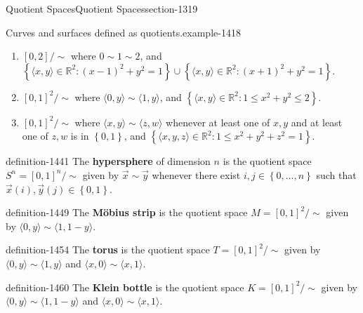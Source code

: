 \documentclass[oneside,10pt,]{article}
\newcommand{\terminology}[1]{\textbf{#1}}
\newcommand{\tuple}[1]{\langle #1 \rangle}
\newcommand{\mb}{\mathbb}
\newcommand{\setBuilder}[2]{\left\{#1:#2\right\}}
\newcommand{\setList}[1]{\left\{#1\right\}}
\begin{document}
\begin{sectionptx}{Quotient Spaces}{}{Quotient Spaces}{}{}{section-1319}
\begin{example}{Curves and surfaces defined as quotients.}{example-1418}
\begin{enumerate}
\item\hypertarget{li-1426}{}\([0,2]/\sim\) where \(0\sim 1\sim 2\), and \(\setBuilder{\tuple{x,y}\in\mb R^2}{(x-1)^2+y^2=1}\cup\setBuilder{\tuple{x,y}\in\mb R^2}{(x+1)^2+y^2=1}\).%
\item\hypertarget{li-1430}{}\([0,1]^2/\sim\) where \(\tuple{0,y}\sim\tuple{1,y}\), and \(\setBuilder{\tuple{x,y}\in\mb R^2}{1\leq x^2+y^2\leq 2}\).%
\item\hypertarget{li-1434}{}\([0,1]^2/\sim\) where \(\tuple{x,y}\sim\tuple{z,w}\) whenever at least one of \(x,y\) and at least one of \(z,w\) is in \(\setList{0,1}\), and \(\setBuilder{\tuple{x,y,z}\in\mb R^2}{1\leq x^2+y^2+z^2=1}\).%
\end{enumerate}
\end{example}
\begin{definition}{}{definition-1441}%
\hypertarget{p-1442}{}%
The \terminology{hypersphere} of dimension \(n\) is the quotient space \(S^n=[0,1]^n/\sim\) given by \(\vec x\sim\vec y\) whenever there exist \(i,j\in\setList{0,\dots,n}\) such that \(\vec x(i),\vec y(j)\in\setList{0,1}\).%
\end{definition}
\begin{definition}{}{definition-1449}%
\hypertarget{p-1450}{}%
The \terminology{Möbius strip} is the quotient space \(M=[0,1]^2/\sim\) given by \(\tuple{0,y}\sim\tuple{1,1-y}\).%
\end{definition}
\begin{definition}{}{definition-1454}%
\hypertarget{p-1455}{}%
The \terminology{torus} is the quotient space \(T=[0,1]^2/\sim\) given by \(\tuple{0,y}\sim\tuple{1,y}\) and \(\tuple{x,0}\sim\tuple{x,1}\).%
\end{definition}
\begin{definition}{}{definition-1460}%
\hypertarget{p-1461}{}%
The \terminology{Klein bottle} is the quotient space \(K=[0,1]^2/\sim\) given by \(\tuple{0,y}\sim\tuple{1,1-y}\) and \(\tuple{x,0}\sim\tuple{x,1}\).%
\end{definition}
\end{sectionptx}
%
%
\typeout{************************************************}
\typeout{************************************************}
%
%
\appendix
%
\end{document}

